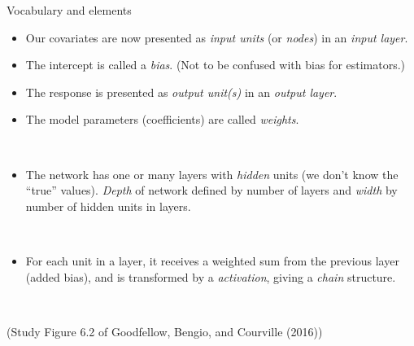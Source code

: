 \documentclass[
  ignorenonframetext,
]{beamer}
\providecommand{\tightlist}{%
  \setlength{\itemsep}{0pt}\setlength{\parskip}{0pt}}
\begin{document}
\begin{frame}
\begin{block}{Vocabulary and elements}
\protect\hypertarget{vocabulary-and-elements}{}
\(~\)

\begin{itemize}
\tightlist
\item
  Our covariates are now presented as \emph{input units} (or
  \emph{nodes}) in an \emph{input layer}.
\item
  The intercept is called a \emph{bias}. (Not to be confused with bias
  for estimators.)
\item
  The response is presented as \emph{output unit(s)} in an \emph{output
  layer}.
\item
  The model parameters (coefficients) are called \emph{weights}.
\end{itemize}

\(~\)

\begin{itemize}
\tightlist
\item
  The network has one or many layers with \emph{hidden} units (we don't
  know the ``true'' values). \emph{Depth} of network defined by number
  of layers and \emph{width} by number of hidden units in layers.
\end{itemize}

\(~\)

\begin{itemize}
\tightlist
\item
  For each unit in a layer, it receives a weighted sum from the previous
  layer (added bias), and is transformed by a \emph{activation}, giving
  a \emph{chain} structure.
\end{itemize}

\(~\)

(Study Figure 6.2 of Goodfellow, Bengio, and Courville (2016))
\end{block}
\end{frame}
\end{document}
